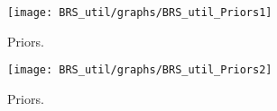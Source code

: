  
\begin{figure}[H]
\centering
\texttt{[image: BRS\_util/graphs/BRS\_util\_Priors1]}
\caption{Priors.}\label{Fig:Priors:1}
\end{figure}
\begin{figure}[H]
\centering
\texttt{[image: BRS\_util/graphs/BRS\_util\_Priors2]}
\caption{Priors.}\label{Fig:Priors:2}
\end{figure}
 
